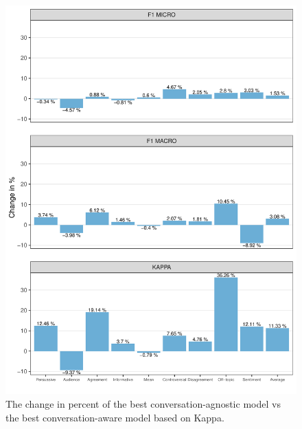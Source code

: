 \begin{figure}
  \begin{center}
    \includegraphics[width=1\textwidth]{graphs/experiments/changes.pdf}
  \end{center}
  \caption{The change in percent of the best conversation-agnostic model vs the best conversation-aware model based on Kappa.}
   \label{fig:res_changes}
\end{figure}

